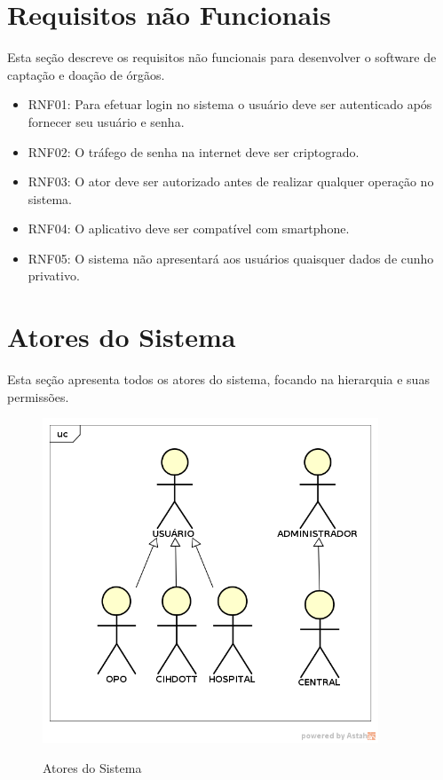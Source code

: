 \documentclass[portuguese,oneside]{tcc}
\begin{document}
\section{Requisitos não Funcionais}

Esta seção descreve os requisitos não funcionais para desenvolver o software de captação e doação de órgãos.

\begin{itemize}

\item RNF01: Para efetuar login no sistema o usuário deve ser autenticado após fornecer seu usuário e senha.

\item RNF02: O tráfego de senha na internet deve ser criptogrado.

\item RNF03: O ator deve ser autorizado antes de realizar qualquer operação no sistema.

\item RNF04: O aplicativo deve ser compatível com smartphone.

\item RNF05: O sistema não apresentará aos usuários quaisquer dados de cunho privativo.

\end{itemize}


\section{Atores do Sistema}
Esta seção apresenta todos os atores do sistema, focando na hierarquia e suas permissões.

\begin{figure}[htp]
\centering
\caption{Atores do Sistema}
\includegraphics[width=10cm]{uc-atores}
\label{fig:uc-atores}
\end{figure}
\end{document}
